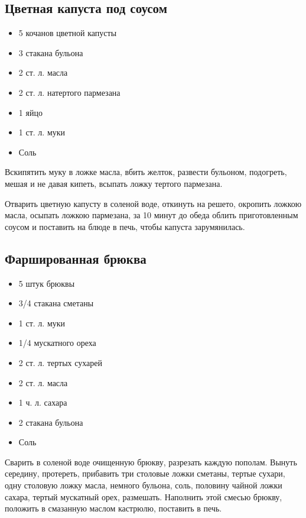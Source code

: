 \subsection{Цветная капуста под соусом}

\begin{itemize}
	\item 5 кочанов цветной капусты 
    \item 3 стакана бульона 
    \item 2 ст. л. масла 
    \item 2 ст. л. натертого пармезана 
    \item 1 яйцо 
    \item 1 ст. л. муки 
    \item Соль
\end{itemize}

Вскипятить муку в ложке масла, вбить желток, развести бульоном, подогреть, мешая и не давая кипеть, всыпать ложку тертого пармезана.

Отварить цветную капусту в соленой воде, откинуть на решето, окропить ложкою масла, осыпать ложкою пармезана, за 10 минут до обеда облить приготовленным соусом и поставить на блюде в печь, чтобы капуста зарумянилась.

\subsection{Фаршированная брюква}

\begin{itemize}
	\item 5 штук брюквы 
    \item 3/4 стакана сметаны 
    \item 1 ст. л. муки 
    \item 1/4 мускатного ореха 
    \item 2 ст. л. тертых сухарей 
    \item 2 ст. л. масла 
    \item 1 ч. л. сахара 
    \item 2 стакана бульона 
    \item Соль
\end{itemize}

Сварить в соленой воде очищенную брюкву, разрезать каждую пополам. Вынуть середину, протереть, прибавить три столовые ложки сметаны, тертые сухари, одну столовую ложку масла, немного бульона, соль, половину чайной ложки сахара, тертый мускатный орех, размешать. Наполнить этой смесью брюкву, положить в смазанную маслом кастрюлю, поставить в печь.

